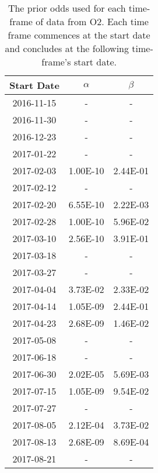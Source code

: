 \begin{table}
\centering
\caption[The prior odd]{The prior odds used for each time-frame of data from O2. Each time frame commences at the start date and concludes at the following time-frame's start date.
    }
\label{tab:priorodds}
\def\arraystretch{1.5} 
\setlength{\tabcolsep}{0.5em}
\begin{tabular}{c|cc}

Start Date & $\alpha$ &  $\beta$ \\
\midrule
2016-11-15 &        - &        - \\
2016-11-30 &        - &        - \\
2016-12-23 &        - &        - \\
2017-01-22 &        - &        - \\
2017-02-03 & 1.00E-10 & 2.44E-01 \\
2017-02-12 &        - &        - \\
2017-02-20 & 6.55E-10 & 2.22E-03 \\
2017-02-28 & 1.00E-10 & 5.96E-02 \\
2017-03-10 & 2.56E-10 & 3.91E-01 \\
2017-03-18 &        - &        - \\
2017-03-27 &        - &        - \\
2017-04-04 & 3.73E-02 & 2.33E-02 \\
2017-04-14 & 1.05E-09 & 2.44E-01 \\
2017-04-23 & 2.68E-09 & 1.46E-02 \\
2017-05-08 &        - &        - \\
2017-06-18 &        - &        - \\
2017-06-30 & 2.02E-05 & 5.69E-03 \\
2017-07-15 & 1.05E-09 & 9.54E-02 \\
2017-07-27 &        - &        - \\
2017-08-05 & 2.12E-04 & 3.73E-02 \\
2017-08-13 & 2.68E-09 & 8.69E-04 \\
2017-08-21 &        - &        - \\

\end{tabular}
\end{table}